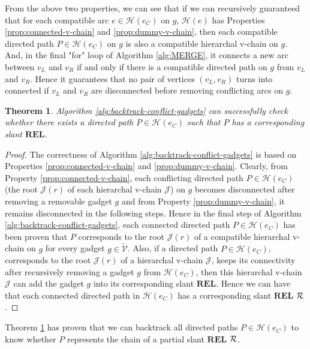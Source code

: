 \documentclass[11pt]{article}
\newcommand{\R}{{\cal R}}
\newcommand{\HH}{\mathcal{H}}
\newcommand{\VV}{\mathcal{V}}
\newcommand{\JJ}{\mathcal{J}}
\newcommand{\REL}{\mathbf{REL}}
\newtheorem{theorem}[figure]{Theorem}
\begin{document}
From the above two properties, we can see that
if we can recursively guaranteed that
for each compatible arc $e\in \HH(e_C)$ on $g$, $\HH(e)$
has Properties \ref{prop:connected-v-chain} and \ref{prop:dummy-v-chain},
then each compatible directed path $P \in \HH(e_C)$ on $g$
is also a compatible hierarchal v-chain on $g$.
And, in the final "for" loop of Algorithm \ref{alg:MERGE},
it connects a new arc between $v_L$ and $v_R$
if and only if there is a compatible directed path on $g$ from $v_L$ and $v_R$.
Hence
it guarantees that no pair of vertices $(v_L, v_R)$ turns into connected if
$v_L$ and $v_R$ are disconnected
before removing conflicting arcs on $g$.

\begin{theorem}\label{thm:backtracking}
Algorithm \ref{alg:backtrack-conflict-gadgets} can successfully
check whether there exists a directed path $P\in \HH(e_C)$
such that $P$ has a corresponding slant $\REL$.
\end{theorem}

\begin{proof}

The correctness of Algorithm \ref{alg:backtrack-conflict-gadgets}
is based on Properties \ref{prop:connected-v-chain} and
\ref{prop:dummy-v-chain}.
Clearly, from Property \ref{prop:connected-v-chain},
each conflicting directed path $P\in \HH(e_C)$
(the root $\JJ(r)$ of each hierarchal v-chain $\JJ$) on $g$
becomes disconnected after removing a removable gadget $g$
and from Property \ref{prop:dummy-v-chain},
it remains disconnected in the following steps.
Hence in the final step of Algorithm \ref{alg:backtrack-conflict-gadgets},
each connected directed path $P\in \HH(e_C)$ has been proven that
$P$ corresponds to the root $\JJ(r)$ of a compatible hierarchal v-chain on $g$
for every gadget $g\in \tilde{\VV}$.
Also,
if a directed path $P\in \HH(e_C)$, corresponds to the root $\JJ(r)$
of a hierarchal v-chain $\JJ$, keeps its connectivity
after recursively removing a gadget $g$ from $\HH(e_C)$, then
this hierarchal v-chain $\JJ$ can add the gadget $g$ into its corresponding slant $\REL$.
Hence we can have that each connected directed path in $\HH(e_C)$
has a corresponding slant $\REL$ $\R$.



\end{proof}

Theorem \ref{thm:backtracking} has proven that
we can backtrack all directed paths $P\in \HH(e_C)$
to know whether $P$ represents
the chain of a partial slant $\REL$ $\R$.
\end{document}
